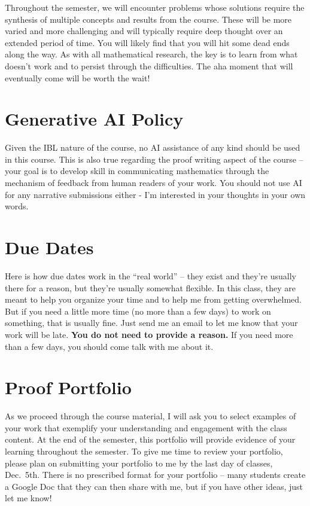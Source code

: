 \documentclass[
  letterpaper,
  DIV=11,
  numbers=noendperiod]{scrreprt}
\begin{document}
Throughout the semester, we will encounter problems whose solutions
require the synthesis of multiple concepts and results from the course.
These will be more varied and more challenging and will typically
require deep thought over an extended period of time. You will likely
find that you will hit some dead ends along the way. As with all
mathematical research, the key is to learn from what doesn't work and to
persist through the difficulties. The aha moment that will eventually
come will be worth the wait!

\chapter{Generative AI Policy}\label{generative-ai-policy}

Given the IBL nature of the course, no AI assistance of any kind should
be used in this course. This is also true regarding the proof writing
aspect of the course -- your goal is to develop skill in communicating
mathematics through the mechanism of feedback from human readers of your
work. You should not use AI for any narrative submissions either - I'm
interested in your thoughts in your own words.

\chapter{Due Dates}\label{due-dates}

Here is how due dates work in the ``real world'' -- they exist and
they're usually there for a reason, but they're usually somewhat
flexible. In this class, they are meant to help you organize your time
and to help me from getting overwhelmed. But if you need a little more
time (no more than a few days) to work on something, that is usually
fine. Just send me an email to let me know that your work will be late.
\textbf{You do not need to provide a reason.} If you need more than a
few days, you should come talk with me about it.

\chapter{Proof Portfolio}\label{proof-portfolio}

As we proceed through the course material, I will ask you to select
examples of your work that exemplify your understanding and engagement
with the class content. At the end of the semester, this portfolio will
provide evidence of your learning throughout the semester. To give me
time to review your portfolio, please plan on submitting your portfolio
to me by the last day of classes, Dec.~5th. There is no prescribed
format for your portfolio -- many students create a Google Doc that they
can then share with me, but if you have other ideas, just let me know!
\end{document}
